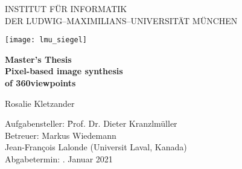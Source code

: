 \begin{center}

\vspace*{-2cm}

{\Huge INSTITUT FÜR INFORMATIK\\[1mm]}
DER LUDWIG--MAXIMILIANS--UNIVERSITÄT MÜNCHEN\\

\vspace*{1cm}

\texttt{[image: lmu\_siegel]}

\vspace*{2cm}

{\Large \textbf{Master's Thesis}}\\ %

\vspace{2.0cm}
{\Huge \textbf{Pixel-based image synthesis}}\\
\vspace*{3mm}
{\Huge \textbf{of 360\degree viewpoints}}\\
\vspace{1.5cm}

{\LARGE Rosalie Kletzander} %
\vspace{2cm}

\parbox{1cm}{
\begin{large}
\begin{tabbing}
Aufgabensteller: \hspace{.5cm} \=Prof. Dr. Dieter Kranzlmüller\\[2mm]
Betreuer:
\>Markus Wiedemann\\ %
\>Jean-Fran\c{c}ois Lalonde (Universit Laval, Kanada)\\[5mm]%
Abgabetermin: . Januar 2021\\
\end{tabbing}
\end{large}}\\
\vspace{5mm}

\end{center}
